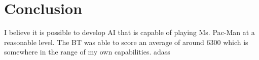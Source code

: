 
\section{Conclusion}
I believe it is possible to develop AI that is capable of playing Ms. Pac-Man at a reasonable level. The BT was able to score an average of around 6300 which is somewhere in the range of my own capabilities. adass
